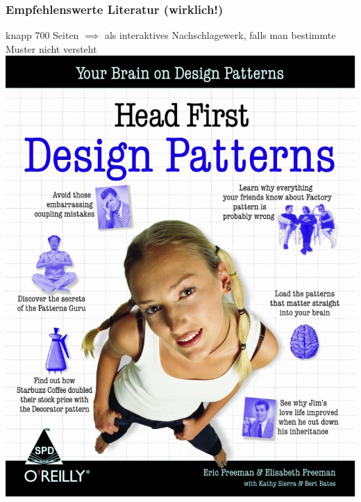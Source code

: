 \documentclass[18pt]{beamer}
\begin{document}
	\begin{frame}
		\frametitle{Empfehlenswerte Literatur (wirklich!)}
		knapp 700 Seiten \linebreak $\implies$ als interaktives Nachschlagewerk, falls man bestimmte Muster nicht versteht \linebreak
		\centering
		\includegraphics[scale=0.15]{./pics/tut3/literature.jpg}
	\end{frame}
		
\end{document}
